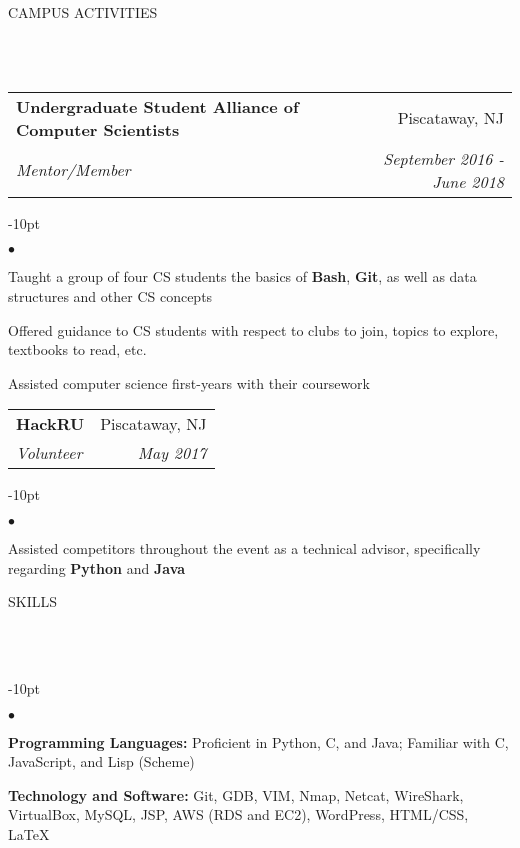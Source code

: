\documentclass[12pt]{article}
\makeatletter
\newcommand{\header}[1]{
	\vspace*{12pt} %
	{\hspace*{-14pt}\vspace*{6pt} #1}
	\vspace*{-6pt} 
	\lineunder
}
\newcommand{\lineunder}{
	\vspace*{-8pt} \\ 
	\hspace*{-18pt} 
	\hrulefill \\
}
\newcommand{\subheading}[4]{
 	\vspace{5pt}
    	\begin{tabular*}{1.01\textwidth}
    		{l@{\extracolsep{\fill}}r}
      		\hspace{-16pt}\textbf{#1} & #2 \\
      		\hspace{-16pt}\textit{\small#3} & \textit{\small #4} \\
    	\end{tabular*}
    \vspace{-4pt}
}
\newenvironment{achievements}{
\begin{adjustwidth}{-10pt}{}
  \begin{list}{$\bullet$}{
  	\topsep 0pt \itemsep -4pt}}
  	{\vspace*{2pt}\end{list}
\end{adjustwidth}
}
\def\cpp{
	{\hspace{-0.25em}C\nolinebreak[4]\hspace{-.05em}\raisebox{.4ex}{\tiny		\bf ++}}}
\makeatother
\begin{document}
\header{CAMPUS ACTIVITIES}

\subheading
	{Undergraduate Student Alliance of Computer Scientists}{Piscataway, NJ}
	{Mentor/Member}{September 2016 - June 2018}
	\begin{achievements}
		\item Taught a group of four CS students the basics of \textbf{Bash}, \textbf{Git}, as well as data structures and other CS concepts
		\item Offered guidance to CS students with respect to clubs to join, topics to explore, textbooks to read, etc.
		\item Assisted computer science first-years with their coursework
	\end{achievements}
	
\subheading
	{HackRU}{Piscataway, NJ}
	{Volunteer}{May 2017}
	\begin{achievements}
		\item Assisted competitors throughout the event as a technical advisor, specifically regarding \textbf{Python} and \textbf{Java}
	\end{achievements}

	
\header{SKILLS}
	\begin{achievements}
		\item{\bf Programming Languages:} Proficient in Python, C, and Java; Familiar with \cpp, JavaScript, and Lisp (Scheme)
		\item{\bf Technology and Software:} Git, GDB, VIM, Nmap, Netcat, WireShark, VirtualBox, MySQL, JSP, AWS (RDS and EC2), WordPress, HTML/CSS, \LaTeX
	\end{achievements}
\end{document}
